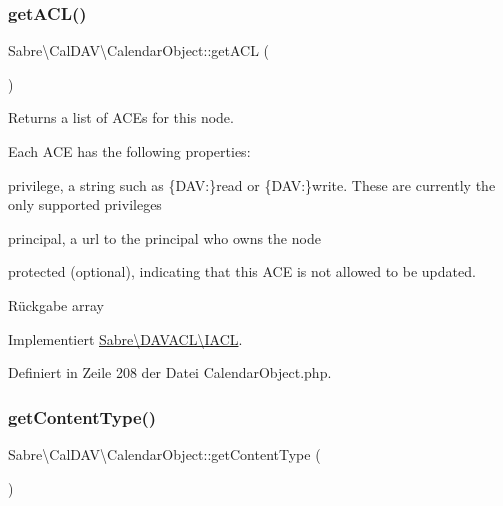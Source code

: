 \subsubsection{\texorpdfstring{get\+A\+C\+L()}{getACL()}}
{\footnotesize\ttfamily Sabre\textbackslash{}\+Cal\+D\+A\+V\textbackslash{}\+Calendar\+Object\+::get\+A\+CL (\begin{DoxyParamCaption}{ }\end{DoxyParamCaption})}

Returns a list of A\+CE\textquotesingle{}s for this node.

Each A\+CE has the following properties\+:
\begin{DoxyItemize}
\item \textquotesingle{}privilege\textquotesingle{}, a string such as \{D\+AV\+:\}read or \{D\+AV\+:\}write. These are currently the only supported privileges
\item \textquotesingle{}principal\textquotesingle{}, a url to the principal who owns the node
\item \textquotesingle{}protected\textquotesingle{} (optional), indicating that this A\+CE is not allowed to be updated.
\end{DoxyItemize}

\begin{DoxyReturn}{Rückgabe}
array 
\end{DoxyReturn}


Implementiert \mbox{\hyperlink{interface_sabre_1_1_d_a_v_a_c_l_1_1_i_a_c_l_a8fe3b3a5b48eae789d7eb722b340045c}{Sabre\textbackslash{}\+D\+A\+V\+A\+C\+L\textbackslash{}\+I\+A\+CL}}.



Definiert in Zeile 208 der Datei Calendar\+Object.\+php.

\mbox{\label{class_sabre_1_1_cal_d_a_v_1_1_calendar_object_a73609b33bcf07b1460038bb125b9d013}} 
\subsubsection{\texorpdfstring{get\+Content\+Type()}{getContentType()}}
{\footnotesize\ttfamily Sabre\textbackslash{}\+Cal\+D\+A\+V\textbackslash{}\+Calendar\+Object\+::get\+Content\+Type (\begin{DoxyParamCaption}{ }\end{DoxyParamCaption})}

